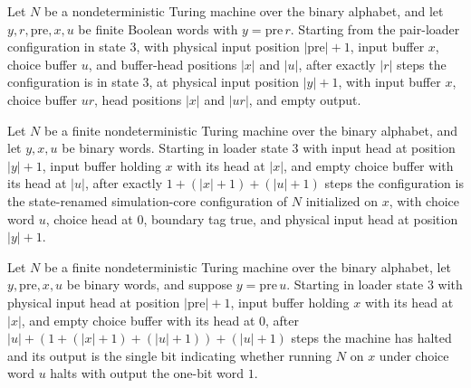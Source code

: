 \begin{lemma}
\label{Complexity.cont_copy_run}
\leanok
{}
Let $N$ be a nondeterministic Turing machine over the binary alphabet, and let
$y,r,\mathrm{pre},x,u$ be finite Boolean words with $y=\mathrm{pre}\,r$. Starting from
the pair-loader configuration in state $3$, with physical input position
$|\mathrm{pre}|+1$, input buffer $x$, choice buffer $u$, and buffer-head positions $|x|$
and $|u|$, after exactly $|r|$ steps the configuration is in state $3$, at physical
input position $|y|+1$, with input buffer $x$, choice buffer $ur$, head positions $|x|$
and $|ur|$, and empty output.
\end{lemma}

\begin{lemma}
\label{Complexity.cont_start_core}
\leanok
{}
Let $N$ be a finite nondeterministic Turing machine over the binary alphabet, and let
$y,x,u$ be binary words. Starting in loader state $3$ with input head at position
$|y|+1$, input buffer holding $x$ with its head at $|x|$, and empty choice buffer with
its head at $|u|$, after exactly $1+(|x|+1)+(|u|+1)$ steps the configuration is the
state-renamed simulation-core configuration of $N$ initialized on $x$, with choice word
$u$, choice head at $0$, boundary tag true, and physical input head at position $|y|+1$.
\end{lemma}

\begin{lemma}
\label{Complexity.cont_suffix_run}
\leanok
{}
Let $N$ be a finite nondeterministic Turing machine over the binary alphabet, let
$y,\mathrm{pre},x,u$ be binary words, and suppose $y=\mathrm{pre}\,u$. Starting in
loader state $3$ with physical input head at position $|\mathrm{pre}|+1$, input buffer
holding $x$ with its head at $|x|$, and empty choice buffer with its head at $0$, after
$|u|+(1+(|x|+1)+(|u|+1))+(|u|+1)$ steps the machine has halted and its output is the
single bit indicating whether running $N$ on $x$ under choice word $u$ halts with output
the one-bit word $1$.
\end{lemma}

